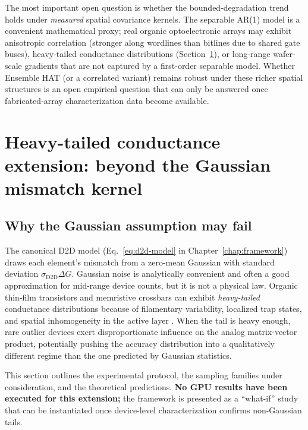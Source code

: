 The most important open question is whether the bounded-degradation trend holds under \emph{measured} spatial covariance kernels.  The separable AR(1) model is a convenient mathematical proxy; real organic optoelectronic arrays may exhibit anisotropic correlation (stronger along wordlines than bitlines due to shared gate buses), heavy-tailed conductance distributions (Section~\ref{sec:heavy-tailed}), or long-range wafer-scale gradients that are not captured by a first-order separable model.  Whether Ensemble HAT (or a correlated variant) remains robust under these richer spatial structures is an open empirical question that can only be answered once fabricated-array characterization data become available.


\section{Heavy-tailed conductance extension: beyond the Gaussian mismatch kernel}
\label{sec:heavy-tailed}

\subsection{Why the Gaussian assumption may fail}

The canonical D2D model (Eq.~\ref{eq:d2d-model} in Chapter~\ref{chap:framework}) draws each element's mismatch from a zero-mean Gaussian with standard deviation $\sigma_{\text{D2D}} \Delta G$.  Gaussian noise is analytically convenient and often a good approximation for mid-range device counts, but it is not a physical law.  Organic thin-film transistors and memristive crossbars can exhibit \emph{heavy-tailed} conductance distributions because of filamentary variability, localized trap states, and spatial inhomogeneity in the active layer \citep{organicvariability2025}.  When the tail is heavy enough, rare outlier devices exert disproportionate influence on the analog matrix-vector product, potentially pushing the accuracy distribution into a qualitatively different regime than the one predicted by Gaussian statistics.

This section outlines the experimental protocol, the sampling families under consideration, and the theoretical predictions.  \textbf{No GPU results have been executed for this extension;} the framework is presented as a ``what-if'' study that can be instantiated once device-level characterization confirms non-Gaussian tails.

